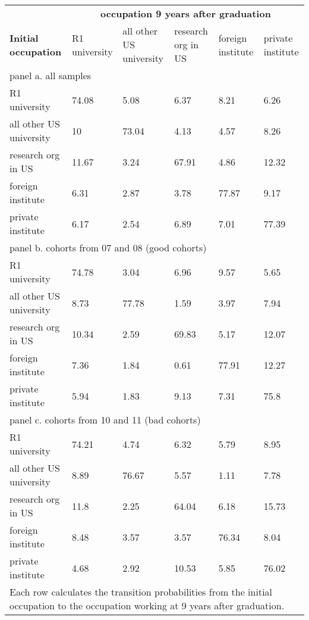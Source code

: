 \begin{table}[htbp]
	\centering

     	\begin{adjustbox}{max width=1\textwidth}
		\begin{tabular}{llllll}
			\hline\hline
			&\multicolumn{5}{c}{\textbf{occupation  9 years after graduation} } \\
			\textbf{Initial occupation}& R1 university     & all other US university     & research org in US     & foreign institute     & private institute    \\ \hline
			\multicolumn{6}{l}{panel a. all samples} \\ \hline
			R1 university       & 74.08 & 5.08  & 6.37  & 8.21  & 6.26  \\
			all other US university        & 10    & 73.04 & 4.13  & 4.57  & 8.26  \\
			research org in US        & 11.67 & 3.24  & 67.91 & 4.86  & 12.32 \\
			foreign institute       & 6.31  & 2.87  & 3.78  & 77.87 & 9.17  \\
			private institute       & 6.17  & 2.54  & 6.89  & 7.01  & 77.39 \\ \hline
			\multicolumn{6}{l}{panel b. cohorts from 07 and 08 (good cohorts)} \\ \hline
			R1 university       & 74.78 & 3.04  & 6.96  & 9.57  & 5.65  \\
			all other US university        & 8.73  & 77.78 & 1.59  & 3.97  & 7.94  \\
			research org in US        & 10.34 & 2.59  & 69.83 & 5.17  & 12.07 \\
			foreign institute       & 7.36  & 1.84  & 0.61  & 77.91 & 12.27 \\
			private institute       & 5.94  & 1.83  & 9.13  & 7.31  & 75.8  \\ \hline
			\multicolumn{6}{l}{panel c. cohorts from 10 and 11 (bad cohorts)} \\ \hline
			R1 university       & 74.21 & 4.74  & 6.32  & 5.79  & 8.95  \\
			all other US university        & 8.89  & 76.67 & 5.57  & 1.11  & 7.78  \\
			research org in US        & 11.8  & 2.25  & 64.04 & 6.18  & 15.73 \\
			foreign institute       & 8.48  & 3.57  & 3.57  & 76.34 & 8.04  \\
			private institute       & 4.68  & 2.92  & 10.53 & 5.85  & 76.02 \\ \hline\hline
			\multicolumn{6}{l}{Each row calculates the transition probabilities from the initial occupation to the  occupation working at 9 years after graduation. } 
		\end{tabular}%
	\end{adjustbox}
\end{table}